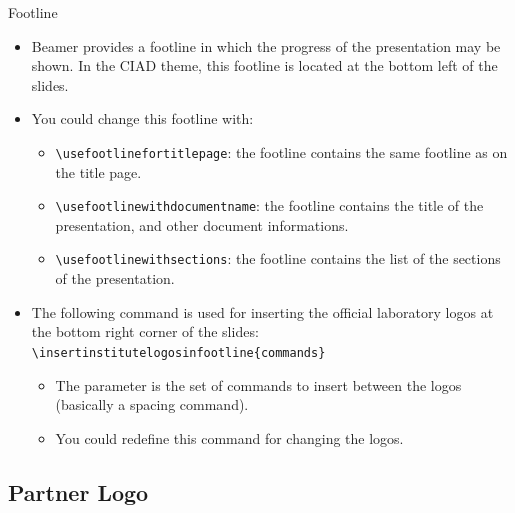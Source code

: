 \documentclass[english,sectioncirclenumberstyle]{ciadbeamer}
\begin{document}
\begin{frame}[t]{Footline}
	\smaller
	\begin{itemize}
	\item Beamer provides a footline in which the progress of the presentation may be shown.
	In the CIAD theme, this footline is located at the bottom left of the slides.
	\vspace{1em}
	\item You could change this footline with: \begin{itemize}
		\item \texttt{{\textbackslash}usefootlinefortitlepage}: the footline contains the same footline as on the title page.
		\item \texttt{{\textbackslash}usefootlinewithdocumentname}: the footline contains the title of the presentation, and other document informations.
		\item \texttt{{\textbackslash}usefootlinewithsections}: the footline contains the list of the sections of the presentation.
		\end{itemize}
	\vspace{1em}
	\item The following command is used for inserting the official laboratory logos at the bottom right corner of the slides: \\
		\texttt{{\textbackslash}insertinstitutelogosinfootline\{commands\}}
		\begin{itemize}
		\item The parameter is the set of commands to insert between the logos (basically a spacing command).
		\item You could redefine this command for changing the logos.
		\end{itemize}
	\end{itemize}
\end{frame}

\subsection{Partner Logo}
\end{document}
